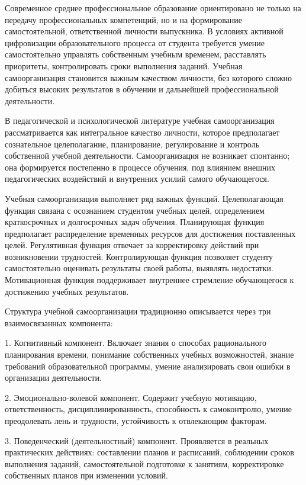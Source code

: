 \documentclass[
]{article}
\begin{document}
Современное среднее профессиональное образование ориентировано не только
на передачу профессиональных компетенций, но и на формирование
самостоятельной, ответственной личности выпускника. В условиях активной
цифровизации образовательного процесса от студента требуется умение
самостоятельно управлять собственным учебным временем, расставлять
приоритеты, контролировать сроки выполнения заданий. Учебная
самоорганизация становится важным качеством личности, без которого
сложно добиться высоких результатов в обучении и дальнейшей
профессиональной деятельности.

В педагогической и психологической литературе учебная самоорганизация
рассматривается как интегральное качество личности, которое предполагает
сознательное целеполагание, планирование, регулирование и контроль
собственной учебной деятельности. Самоорганизация не возникает
спонтанно; она формируется постепенно в процессе обучения, под влиянием
внешних педагогических воздействий и внутренних усилий самого
обучающегося.

Учебная самоорганизация выполняет ряд важных функций. Целеполагающая
функция связана с осознанием студентом учебных целей, определением
краткосрочных и долгосрочных задач обучения. Планирующая функция
предполагает распределение временных ресурсов для достижения
поставленных целей. Регулятивная функция отвечает за корректировку
действий при возникновении трудностей. Контролирующая функция позволяет
студенту самостоятельно оценивать результаты своей работы, выявлять
недостатки. Мотивационная функция поддерживает внутреннее стремление
обучающегося к достижению учебных результатов.

Структура учебной самоорганизации традиционно описывается через три
взаимосвязанных компонента:

1. Когнитивный компонент. Включает знания о способах рационального
планирования времени, понимание собственных учебных возможностей, знание
требований образовательной программы, умение анализировать свои ошибки в
организации деятельности.

2. Эмоционально-волевой компонент. Содержит учебную мотивацию,
ответственность, дисциплинированность, способность к самоконтролю,
умение преодолевать лень и трудности, устойчивость к отвлекающим
факторам.

3. Поведенческий (деятельностный) компонент. Проявляется в реальных
практических действиях: составлении планов и расписаний, соблюдении
сроков выполнения заданий, самостоятельной подготовке к занятиям,
корректировке собственных планов при изменении условий.
\end{document}

